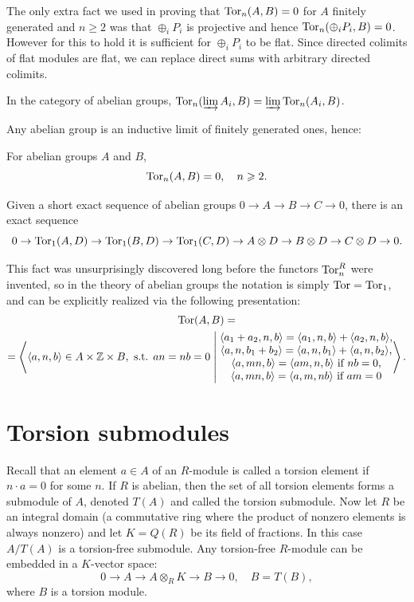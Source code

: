 The only extra fact we used in proving that $\operatorname{Tor}_n(A,B)=0$ for $A$ finitely generated and $n\geq 2$ was that $\oplus_i P_i$ is projective and hence $\operatorname{Tor}_n(\oplus_i P_i,B)=0$. However for this to hold it is sufficient for $\oplus_i P_i$ to be flat. Since directed colimits of flat modules are flat, we can replace direct sums with arbitrary directed colimits.

\begin{thm} In the category of abelian groups,
    $\operatorname{Tor}_n(\varinjlim A_i,B)=\varinjlim \operatorname{Tor}_n(A_i,B)$.
\end{thm}
Any abelian group is an inductive limit of finitely generated ones, hence:
\begin{cor}
    For abelian groups $A$ and $B$,
    \[\operatorname{Tor}_n(A,B)=0,\quad n\geqslant 2.\]
\end{cor}
\begin{cor}
    Given a short exact sequence of abelian groups $0\to A\to B\to C\to 0$, there is an exact sequence
    \[0\to\operatorname{Tor}_1(A,D)\to \operatorname{Tor}_1(B,D)\to \operatorname{Tor}_1(C,D)\to A\otimes D\to B\otimes D\to C\otimes D\to 0.\]
\end{cor}

This fact was unsurprisingly discovered long before the functors $\operatorname{Tor}_n^R$ were invented, so in the theory of abelian groups the notation is simply $\operatorname{Tor}=\operatorname{Tor}_1$, and can be explicitly realized via the following presentation:
\begin{multline}
    \Tor(A,B)=\\
    =\left\langle \langle a,n,b\rangle\in A\times \bbZ\times B,\text{ s.t. } an=nb=0 
    \middle|
    \begin{matrix}
    \langle a_1+a_2,n,b\rangle= \langle a_1,n,b\rangle+\langle a_2,n,b\rangle,\\
    \langle a,n,b_1+b_2\rangle=\langle a,n,b_1\rangle+\langle a,n,b_2\rangle,\\
    \langle a,mn,b\rangle=\langle am,n,b\rangle \text{ if }nb=0,\\
    \langle a,mn,b\rangle=\langle a,m,nb\rangle \text{ if }am=0
    \end{matrix}
    \right\rangle.
\end{multline}




\section{Torsion submodules}

Recall that an element $a\in A$ of an $R$-module is called a torsion element if $n\cdot a=0$ for some $n$. If $R$ is abelian, then the set of all torsion elements forms a submodule of $A$, denoted $T(A)$ and called the torsion submodule. Now let $R$ be an integral domain (a commutative ring where the product of nonzero elements is always nonzero) and let $K=Q(R)$ be its field of fractions. In this case $A\slash T(A)$ is a torsion-free submodule. Any torsion-free $R$-module can be embedded in a $K$-vector space:
\[0\to A\to A\otimes_R K\to B\to 0,\quad B=T(B),\]
where $B$ is a torsion module.

